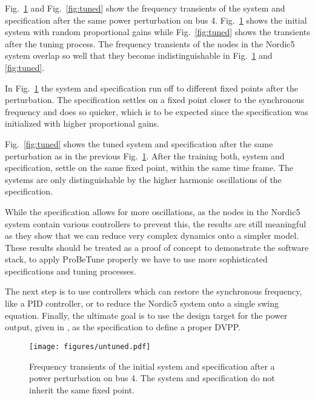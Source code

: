 \documentclass[conference]{IEEEtran}
\begin{document}
Fig.~\ref{fig:untuned} and Fig.~\ref{fig:tuned} show the frequency transients of the system and specification after the same power perturbation on bus 4. Fig.~\ref{fig:untuned} shows the initial system with random proportional gains while Fig.~\ref{fig:tuned} shows the transients after the tuning process. The frequency transients of the nodes in the Nordic5 system overlap so well that they become indistinguishable in Fig.~\ref{fig:untuned} and \ref{fig:tuned}.

In Fig.~\ref{fig:untuned} the system and specification run off to different fixed points after the perturbation. The specification settles on a fixed point closer to the synchronous frequency and does so quicker, which is to be expected since the specification was initialized with higher proportional gains.

Fig.~\ref{fig:tuned} shows the tuned system and specification after the same perturbation as in the previous Fig.~\ref{fig:untuned}. After the training both, system and specification, settle on the same fixed point, within the same time frame. The systems are only distinguishable by the higher harmonic oscillations of the specification. 

While the specification allows for more oscillations, as the nodes in the Nordic5 system contain various controllers to prevent this, the results are still meaningful as they show that we can reduce very complex dynamics onto a simpler model. 
These results should be treated as a proof of concept to demonstrate the software stack, to apply ProBeTune properly we have to use more sophisticated specifications and tuning processes.

The next step is to use controllers which can restore the synchronous frequency, like a PID controller, or to reduce the Nordic5 system onto a single swing equation. Finally, the ultimate goal is to use the design target for the power output, given in \cite{hydro_and_wind}, as the specification to define a proper DVPP.
    
\begin{figure}%
    \centering
    \texttt{[image: figures/untuned.pdf]}
    \caption{Frequency transients of the initial system and specification after a power perturbation on bus 4. The system and specification do not inherit the same fixed point. \label{fig:untuned}}
\end{figure}
    
\end{document}
